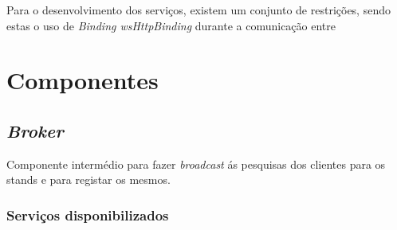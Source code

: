\documentclass[a4paper]{article}
\begin{document}
Para o desenvolvimento dos serviços, existem um conjunto de restrições, sendo estas o uso de \emph{Binding wsHttpBinding} durante a comunicação entre 

\newpage

\section{Componentes}

\subsection{\emph{Broker} } Componente intermédio para fazer \emph{broadcast} ás pesquisas dos clientes para os stands e para registar os mesmos.

\subsubsection{Serviços disponibilizados}
\end{document}
